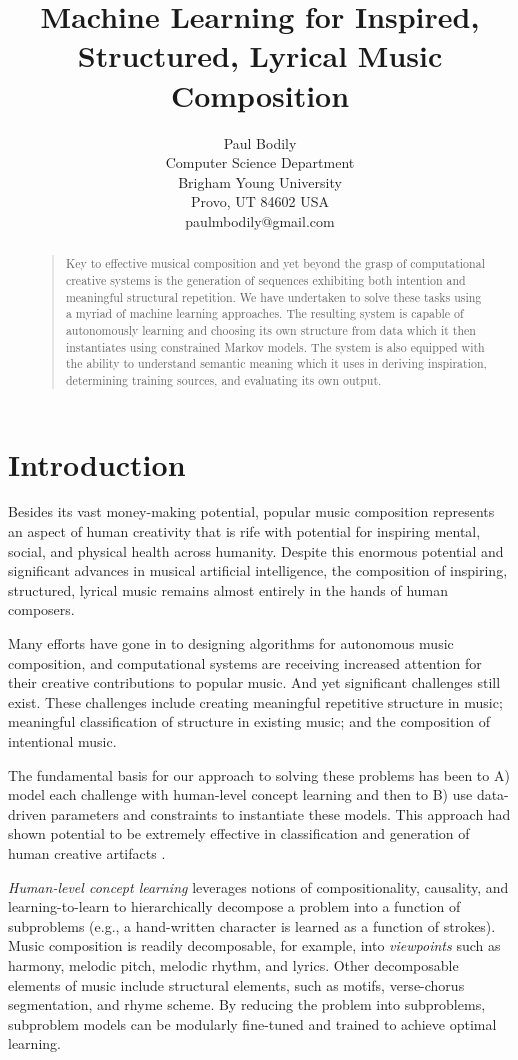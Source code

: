 \documentclass[letterpaper]{article}
\title{Machine Learning for Inspired, Structured, Lyrical Music Composition}
\author{Paul Bodily\\
Computer Science Department\\
Brigham Young University\\
Provo, UT 84602  USA\\
paulmbodily@gmail.com\\
}
\begin{document}
 
\maketitle
\begin{abstract}
\begin{quote}
Key to effective musical composition and yet beyond the grasp of computational creative systems is the generation of sequences exhibiting both intention and meaningful structural repetition. We have undertaken to solve these tasks using a myriad of machine learning approaches. The resulting system is capable of autonomously learning and choosing its own structure from data which it then instantiates using constrained Markov models. The system is also equipped with the ability to understand semantic meaning which it uses in deriving inspiration, determining training sources, and evaluating its own output.
\end{quote}
\end{abstract}

\section{Introduction}

Besides its vast money-making potential, popular music composition represents an aspect of human creativity that is rife with potential for inspiring mental, social, and physical health across humanity. Despite this enormous potential and significant advances in musical artificial intelligence, the composition of inspiring, structured, lyrical music remains almost entirely in the hands of human composers.

Many efforts have gone in to designing algorithms for autonomous music composition, and computational systems are receiving increased attention for their creative contributions to popular music. And yet significant challenges still exist. These challenges include creating meaningful repetitive structure in music; meaningful classification of structure in existing music; and the composition of intentional music.

The fundamental basis for our approach to solving these problems has been to A) model each challenge with human-level concept learning and then to B) use data-driven parameters and constraints to instantiate these models. This approach had shown potential to be extremely effective in classification and generation of human creative artifacts \cite{lake2015human}.

\emph{Human-level concept learning} leverages notions of compositionality, causality, and learning-to-learn to hierarchically decompose a problem into a function of subproblems (e.g., a hand-written character is learned as a function of strokes). Music composition is readily decomposable, for example, into \emph{viewpoints} such as harmony, melodic pitch, melodic rhythm, and lyrics. Other decomposable elements of music include structural elements, such as motifs, verse-chorus segmentation, and rhyme scheme. By reducing the problem into subproblems, subproblem models can be modularly fine-tuned and trained to achieve optimal learning.
\end{document}
